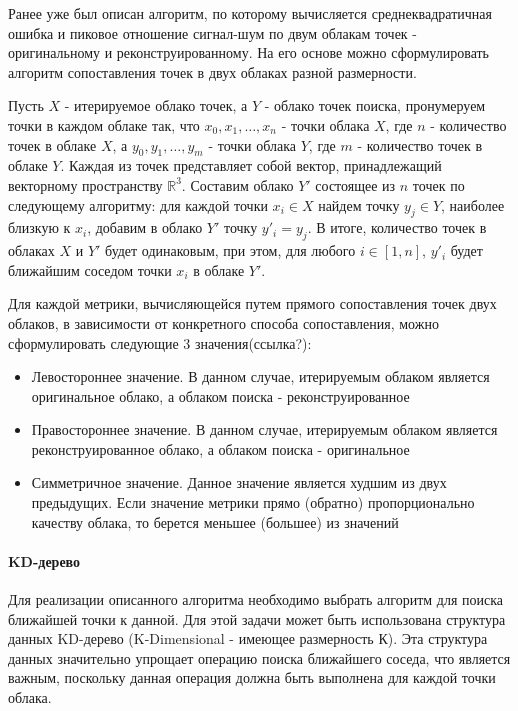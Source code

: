 Ранее уже был описан алгоритм, по которому вычисляется среднеквадратичная ошибка
и пиковое отношение сигнал-шум по двум облакам точек - оригинальному и
реконструированному. На его основе можно сформулировать алгоритм сопоставления
точек в двух облаках разной размерности.

Пусть $X$ - итерируемое облако точек, а $Y$ - облако точек поиска, пронумеруем
точки в каждом облаке так, что $x_{0}, x_{1}, \dots, x_{n}$ - точки облака $X$,
где $n$ - количество точек в облаке $X$, а $y_{0}, y_{1}, \dots, y_{m}$ - точки
облака $Y$, где $m$ - количество точек в облаке $Y$. Каждая из точек
представляет собой вектор, принадлежащий векторному пространству
$\mathbb{R}^{3}$. Составим облако $Y'$ состоящее из $n$ точек по следующему
алгоритму: для каждой точки $x_{i} \in X$ найдем точку $y_{j} \in Y$, наиболее
близкую к $x_{i}$, добавим в облако $Y'$ точку $y'_{i} = y_{j}$. В итоге,
количество точек в облаках $X$ и $Y'$ будет одинаковым, при этом, для любого $i
\in \left[1, n\right]$, $y'_{i}$ будет ближайшим соседом точки $x_{i}$ в облаке
$Y'$.

Для каждой метрики, вычисляющейся путем прямого сопоставления точек двух
облаков, в зависимости от конкретного способа сопоставления, можно
сформулировать следующие 3 значения(ссылка?):

\begin{itemize}
    \item Левостороннее значение. В данном случае, итерируемым облаком является
    оригинальное облако, а облаком поиска - реконструированное
    \item Правостороннее значение. В данном случае, итерируемым облаком является
    реконструированное облако, а облаком поиска - оригинальное
    \item Симметричное значение. Данное значение является худшим из двух
    предыдущих. Если значение метрики прямо (обратно) пропорционально качеству
    облака, то берется меньшее (большее) из значений
\end{itemize}

\paragraph{KD-дерево}

Для реализации описанного алгоритма необходимо выбрать алгоритм для поиска
ближайшей точки к данной. Для этой задачи может быть использована структура
данных KD-дерево (K-Dimensional - имеющее размерность
К)\cite[23]{PointCloudAnalysis}. Эта структура данных значительно упрощает
операцию поиска ближайшего соседа, что является важным, поскольку данная
операция должна быть выполнена для каждой точки облака.


